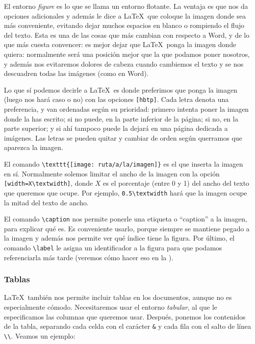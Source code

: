 El entorno \textit{figure} es lo que se llama un entorno flotante. La ventaja es que nos da opciones adicionales y además le dice a \LaTeX\ que coloque la imagen donde sea más conveniente, evitando dejar muchos espacios en blanco o rompiendo el flujo del texto. Esta es una de las cosas que más cambian con respecto a Word, y de lo que más cuesta convencer: es mejor dejar que \LaTeX\ ponga la imagen donde quiera: normalmente será una posición mejor que la que podamos poner nosotros, y además nos evitaremos dolores de cabeza cuando cambiemos el texto y se nos descuadren todas las imágenes (como en Word).

Lo que sí podemos decirle a \LaTeX\ es donde preferimos que ponga la imagen (luego nos hará caso o no) con las opciones \texttt{[hbtp]}. Cada letra denota una preferencia, y van ordenadas según su prioridad: primero intenta poner la imagen donde la has escrito; si no puede, en la parte inferior de la página; si no, en la parte superior; y si ahí tampoco puede la dejará en una página dedicada a imágenes. Las letras se pueden quitar y cambiar de orden según querramos que aparezca la imagen.

El comando \verb|\texttt{[image: ruta/a/la/imagen]}| es el que inserta la imagen en sí. Normalmente solemos limitar el ancho de la imagen con la opción \verb|[width=X\textwidth]|, donde $X$ es el porcentaje (entre 0 y 1) del ancho del texto que queremos que ocupe. Por ejemplo, \verb|0.5\textwidth| hará que la imagen ocupe la mitad del texto de ancho.

El comando \verb|\caption| nos permite ponerle una etiqueta o ``caption'' a la imagen, para explicar qué es. Es conveniente usarlo, porque siempre se mantiene pegado a la imagen y además nos permite ver qué índice tiene la figura. Por último, el comando \verb|\label| le asigna un identificador a la figura para que podamos referenciarla más tarde (veremos cómo hacer eso en la ).

\subsubsection{Tablas}
\label{sec:Tablas}

\LaTeX\ también nos permite incluir tablas en los documentos, aunque no es especialmente cómodo. Necesitaremos usar el entorno \textit{tabular}, al que le especificamos las columnas que queremos usar. Después, ponemos los contenidos de la tabla, separando cada celda con el carácter \verb|&| y cada fila con el salto de línea \verb|\\|. Veamos un ejemplo:


